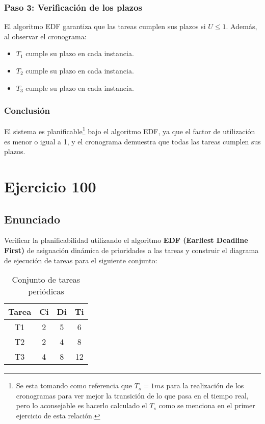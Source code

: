 \documentclass[a4paper,12pt]{article}
\begin{document}
\subsubsection{Paso 3: Verificación de los plazos}
El algoritmo EDF garantiza que las tareas cumplen sus plazos si \(U \leq 1\). Además, al observar el cronograma:
\begin{itemize}
    \item \(T_1\) cumple su plazo en cada instancia.
    \item \(T_2\) cumple su plazo en cada instancia.
    \item \(T_3\) cumple su plazo en cada instancia.
\end{itemize}

\subsubsection{Conclusión}
El sistema es planificable\footnote{Se esta tomando como referencia que \(T_s = 1ms\) para la realización de los cronogramas para ver mejor la transición de lo que pasa en el tiempo real, pero lo aconsejable es hacerlo calculado el \(T_s\) como se menciona en el primer ejercicio de esta relación.} bajo el algoritmo EDF, ya que el factor de utilización es menor o igual a 1, y el cronograma demuestra que todas las tareas cumplen sus plazos.


\section{Ejercicio 100}
\subsection{Enunciado}
Verificar la planificabilidad utilizando el algoritmo \textbf{EDF (Earliest Deadline First)} de asignación dinámica de prioridades a las tareas y construir el diagrama de ejecución de tareas para el siguiente conjunto:

\begin{table}[H]
\centering
\begin{tabular}{|c|c|c|c|}
\hline
\textbf{Tarea} & \textbf{Ci} & \textbf{Di} & \textbf{Ti} \\ \hline
T1 & 2 & 5 & 6 \\ \hline
T2 & 2 & 4 & 8 \\ \hline
T3 & 4 & 8 & 12 \\ \hline
\end{tabular}
\caption{Conjunto de tareas periódicas}
\end{table}
\end{document}
